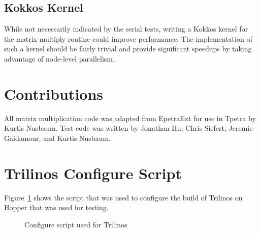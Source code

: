 \documentclass[pdf,12pt]{SANDreport}
\begin{document}
\subsection{Kokkos Kernel}
While not necessarily indicated by the serial tests, writing a Kokkos kernel for the matrix-multiply routine could improve
performance. The implementation of such a kernel should be fairly trivial and provide significant speedups by taking
advantage of node-level parallelism.

\section{Contributions}
All matrix multiplication code was adapted from EpetraExt for use in Tpetra by Kurtis Nusbaum. Test code was written by 
Jonathan Hu, Chris Siefert, Jeremie Gaidamour, and Kurtis Nusbaum.

\clearpage
\providecommand*{\phantomsection}{}
\phantomsection
{}



\appendix
\section{Trilinos Configure Script}
Figure~\ref{triConf} shows the script that was used to configure the build of Trilinos on Hopper that was used for testing.
\begin{figure}
\centering
{\footnotesize
{}
}
\caption{Configure script used for Trilinos}
\label{triConf}
\end{figure}
\begin{SANDdistribution}[NM]

\end{SANDdistribution}
\end{document}
